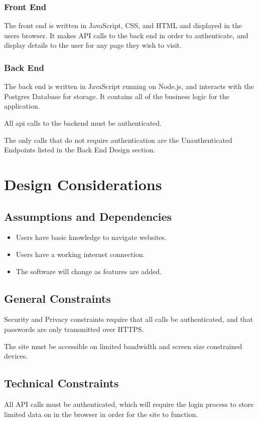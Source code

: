 \subsubsection{Front End}
The front end is written in JavaScript, CSS, and HTML and displayed in the users browser.
It makes API calls to the back end in order to authenticate, and display details to the user for any page they wish to visit.

\subsubsection{Back End}
The back end is written in JavaScript running on Node.js, and interacts with the Postgres Database for storage. It contains all of the business logic for the application.

All api calls to the backend must be authenticated.

The only calls that do not require authentication are the Unauthenticated Endpoints listed in the Back End Design section.

\newpage %
\section{Design Considerations}
    \subsection{Assumptions and Dependencies}
        \begin{itemize}[leftmargin=3\parindent]
            \item Users have basic knowledge to navigate websites.
            \item Users have a working internet connection.
            \item The software will change as features are added.
        \end{itemize}

    \subsection{General Constraints}
    Security and Privacy constraints require that all calls be authenticated, and that passwords are only transmitted over HTTPS.

    The site must be accessible on limited bandwidth and screen size constrained devices.

    \subsection{Technical Constraints}
    All API calls must be authenticated, which will require the login process to store limited data on in the browser in order for the site to function.


